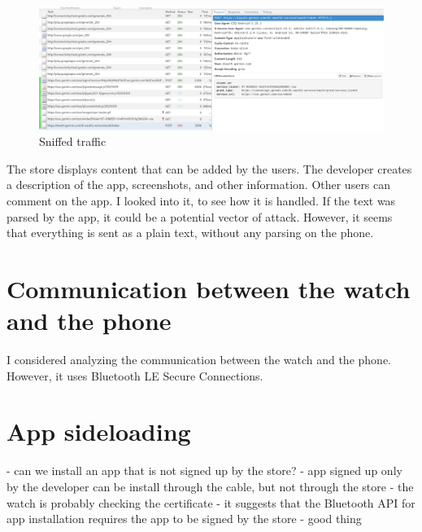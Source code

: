 \begin{figure}[h]
    \centering
    \includegraphics[width=1\linewidth]{../../images/mitmproxy unpinner}
    \caption{Sniffed traffic}
    \label{fig:mitmproxy-unpinner}
\end{figure}

The store displays content that can be added by the users.
The developer creates a description of the app, screenshots, and other information.
Other users can comment on the app.
I looked into it, to see how it is handled.
If the text was parsed by the app, it could be a potential vector of attack.
However, it seems that everything is sent as a plain text, without any parsing on the phone.

\section{Communication between the watch and the phone}
I considered analyzing the communication between the watch and the phone.
However, it uses Bluetooth LE Secure Connections.

\section{App sideloading}
\label{app-sideloading}
- can we install an app that is not signed up by the store?
- app signed up only by the developer can be install through the cable, but not through the store
- the watch is probably checking the certificate
- it suggests that the Bluetooth API for app installation requires the app to be signed by the store - good thing
